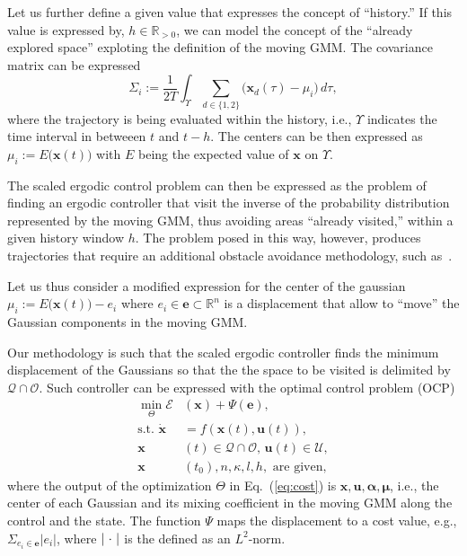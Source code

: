 \documentclass[letterpaper,10pt,conference,twoside]{IEEEtran}
\theoremstyle{definition}
\begin{document}
Let us further define a given value that expresses the concept of ``history.'' If this value is expressed by, $h\in\mathbb{R}_{>0}$, we can model the concept of the ``already explored space'' exploting the definition of the moving GMM. The covariance matrix can be expressed
\begin{equation}
  \Sigma_i:=\frac{1}{2T}\int_\Upsilon\sum_{d\in\{1,2\}}{\big(\mathbf{x}_d(\tau)-\mu_i\big)}\,d\tau,
\end{equation}
where the trajectory is being evaluated within the history, i.e., $\Upsilon$ indicates the time interval in betweeen $t$ and $t-h$.
%
The centers can be then expressed as $\mu_i:=E\big(\mathbf{x}(t)\big)$ with $E$ being the expected value of $\mathbf{x}$ on $\Upsilon$. 

The scaled ergodic control problem can then be expressed as the problem of finding an ergodic controller that visit the inverse of the probability distribution represented by the moving GMM, thus avoiding areas ``already visited,'' within a given history window $h$. The problem posed in this way, however, produces trajectories that require an additional obstacle avoidance methodology, such as~\cite{lerch2023safety}.

Let us thus consider a modified expression for the center of the gaussian $\mu_i:=E\big(\mathbf{x}(t)\big)-e_i$ where $e_i\in\mathbf{e}\subset\mathbb{R}^n$ is a displacement that allow to ``move'' the Gaussian components in the moving GMM. 

Our methodology is such that the scaled ergodic controller finds the minimum displacement of the Gaussians so that the the space to be visited is delimited by $\mathcal{Q}\cap\mathcal{O}$. Such controller can be expressed with the optimal control problem (OCP)
\begin{subequations}\label{eq:ocp}\begin{align}
  \min_{\Theta}%
  \mathcal{E}&(\mathbf{x})+\Psi(\mathbf{e}),\label{eq:cost}\\
  \text{s.t. }\dot{\mathbf{x}}&=f(\mathbf{x}(t),\mathbf{u}(t)),\label{eq:dyn}\\
  \mathbf{x}&(t)\in\mathcal{Q}\cap\mathcal{O},\,\mathbf{u}(t)\in\mathcal{U},\\
  \mathbf{x}&(t_0),n,\kappa,l,h,\text{ are given},\label{eq:ocpconsttotf}
\end{align}\end{subequations}
where the output of the optimization $\Theta$ in Eq.~(\ref{eq:cost}) is $\mathbf{x},\mathbf{u},\boldsymbol{\alpha},\boldsymbol{\mu}$, i.e., the center of each Gaussian and its mixing coefficient in the moving GMM along the control and the state. The function $\Psi$ maps the displacement to a cost value, e.g., $\Sigma_{e_i\in\mathbf{e}}|e_i|$, where $|\hspace{.2ex}\cdot\hspace{.2ex}|$ is the defined as an $L^2$-norm.
\end{document}
